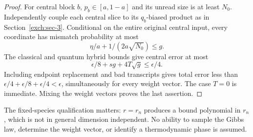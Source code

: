 \begin{proof}
For central block \(b\), \(p_b\in[a,1-a]\) and its unread size is at
least \(N_0\). Independently couple each central slice to its
\(q_b\)-biased product as in Section~\ref{exch:sec-3}. Conditional on
the entire original central input, every coordinate has mismatch
probability at most
\[
 \eta/a+1/(2a\sqrt{N_0})\le g.
\]
The classical and quantum hybrid bounds give central error at most
\[
 \epsilon/8+sg+4T\sqrt g\le\epsilon/4.
\]
Including endpoint replacement and bad transcripts gives total error
less than \(\epsilon/4+\epsilon/8+\epsilon/4<\epsilon\), simultaneously
for every weight vector. The case \(T=0\) is immediate. Mixing the
weight vectors proves the last assertion.
\end{proof}

The fixed-species qualification matters: \(r=r_n\) produces a bound
polynomial in \(r_n\), which is not in general dimension independent.
No ability to sample the Gibbs law, determine the weight vector, or
identify a thermodynamic phase is assumed.
